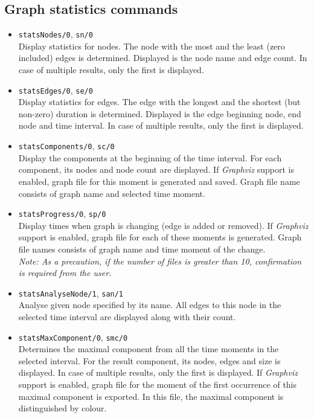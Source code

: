 \documentclass[11pt, a4paper]{article}
\newcommand{\pl}[1]{\texttt{#1}} %
\theoremstyle{plain}
\theoremstyle{definition}
\theoremstyle{remark}
\newcommand{\gv}{\textit{Graphviz}}
\begin{document}
\subsection{Graph statistics commands}

\begin{itemize}
\item \pl{statsNodes/0}, \pl{sn/0} \\
Display statistics for nodes. 
The node with the most and the least (zero included) edges is determined. 
Displayed is the node name and edge count. 
In case of multiple results, only the first is displayed. \\

\item \pl{statsEdges/0}, \pl{se/0} \\
Display statistics for edges. 
The edge with the longest and the shortest (but non-zero) duration is determined.  
Displayed is the edge beginning node, end node and time interval. 
In case of multiple results, only the first is displayed.

\item \pl{statsComponents/0}, \pl{sc/0} \\
Display the components at the beginning of the time interval. 
For each component, its nodes and node count are displayed. 
If \gv{} support is enabled, graph file for this moment is generated and saved. 
Graph file name consists of graph name and selected time moment.

\item \pl{statsProgress/0}, \pl{sp/0} \\
Display times when graph is changing (edge is added or removed). 
If \gv{} support is enabled, graph file for each of these moments is generated. 
Graph file names consists of graph name and time moment of the change. \\
\textit{Note: As a precaution, if the number of files is greater than 10, confirmation is required from the user.}

\item \pl{statsAnalyseNode/1}, \pl{san/1} \\
Analyse given node specified by its name. 
All edges to this node in the selected time interval are displayed along with their count.

\item \pl{statsMaxComponent/0}, \pl{smc/0} \\
Determines the maximal component from all the time moments in the selected interval. 
For the result component, its nodes, edges and size is displayed. 
In case of multiple results, only the first is displayed.
If \gv{} support is enabled, graph file for the moment of the first occurrence of this maximal component is exported.
In this file, the maximal component is distinguished by colour.

\end{itemize}
\end{document}
